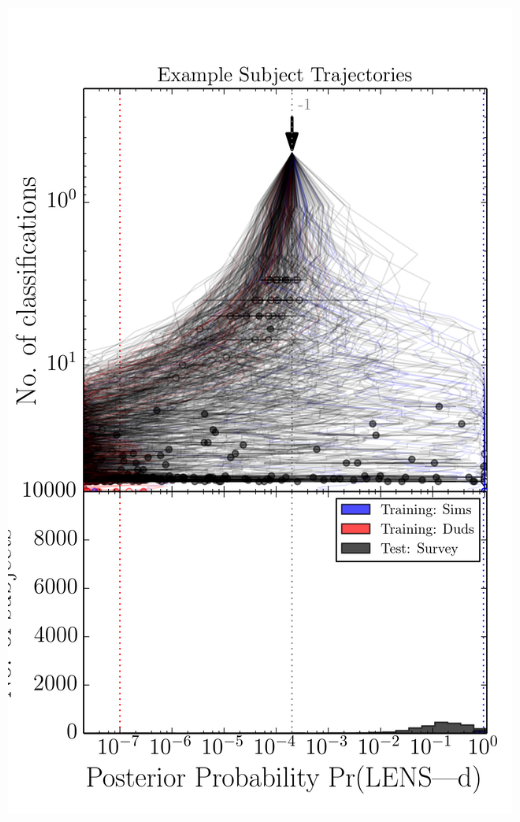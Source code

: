 \documentclass[letterpaper,12pt]{article}
\begin{document}
\begin{minipage}{0.56\linewidth}
\includegraphics[width=\linewidth]{./offline//CFHTLS_now_trajectories.png}
\end{minipage}
\end{document}

